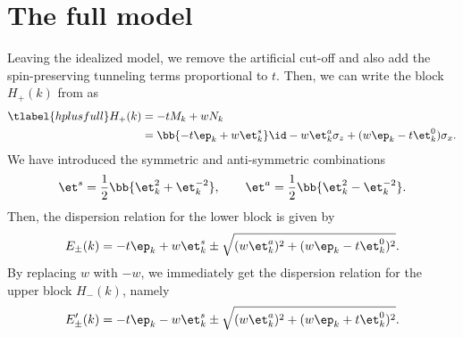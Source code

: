

\section{The full model}
Leaving the idealized model, we remove the artificial cut-off and also add the spin-preserving tunneling terms proportional to $t$.
Then, we can write the block $H_+(k)$ from  as
\begin{align} \tlabel{hplusfull}
    H_+(k) &= -t M_k + w N_k \\
           &= \bb{-t \ep_k + w \et^{s}_k} \id - w\et^{a}_k \sigma_z + (w \ep_k - t \et^0_k) \sigma_x.
\end{align}
We have introduced the symmetric and anti-symmetric combinations
\begin{align}
    \et^s = \frac{1}{2} \bb{ \et^2_k + \et^{-2}_{k} }, \qquad
    \et^a = \frac{1}{2} \bb{ \et^2_k - \et^{-2}_{k} }.
\end{align}
Then, the dispersion relation for the lower block is given by
\begin{align}
    E_\pm(k) = -t \ep_k + w \et^s_k \pm \sqrt{(w \et^a_k)^2+(w \ep_k - t \et^0_k)^2}.
\end{align}
By replacing $w$ with $-w$, we immediately get the dispersion relation for the upper block $H_-(k)$, namely
\begin{align}
    E'_\pm(k) = -t \ep_k - w \et^s_k \pm \sqrt{(w \et^a_k)^2+(w \ep_k + t \et^0_k)^2}.
\end{align}

